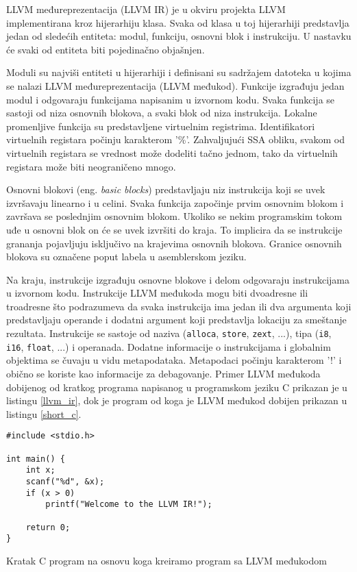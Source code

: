 \documentclass[12pt,oneside]{memoir}
\begin{document}
LLVM međureprezentacija (LLVM IR) je u okviru projekta LLVM implementirana kroz hijerarhiju klasa. Svaka od klasa u toj hijerarhiji predstavlja jedan od sledećih entiteta: modul, funkciju, osnovni blok i instrukciju. U nastavku će svaki od entiteta biti pojedinačno objašnjen.

Moduli su najviši entiteti u hijerarhiji i definisani su sadržajem datoteka u kojima se nalazi LLVM međureprezentacija (LLVM međukod). Funkcije izgrađuju jedan modul i odgovaraju funkcijama napisanim u izvornom kodu. Svaka funkcija se sastoji od niza osnovnih blokova, a svaki blok od niza instrukcija. Lokalne promenljive funkcija su predstavljene virtuelnim registrima. Identifikatori virtuelnih registara počinju karakterom ’\%’. Zahvaljujući SSA obliku, svakom od virtuelnih registara se vrednost može dodeliti tačno jednom, tako da virtuelnih registara može biti neograničeno mnogo.

Osnovni blokovi (eng. \textit{basic blocks}) predstavljaju niz instrukcija koji se uvek izvršavaju linearno i u celini. Svaka funkcija započinje prvim osnovnim blokom i završava se poslednjim osnovnim blokom. Ukoliko se nekim programskim tokom uđe u osnovni blok on će se uvek izvršiti do kraja. To implicira da se instrukcije grananja pojavljuju isključivo na krajevima osnovnih blokova. Granice osnovnih blokova su označene poput labela u asemblerskom jeziku.

Na kraju, instrukcije izgrađuju osnovne blokove i delom odgovaraju instrukcijama u izvornom kodu. Instrukcije LLVM međukoda mogu biti dvoadresne ili troadresne što podrazumeva da svaka instrukcija ima jedan ili dva argumenta koji predstavljaju operande i dodatni argument koji predstavlja lokaciju za smeštanje rezultata. 
Instrukcije se sastoje od naziva (\texttt{alloca}, \texttt{store}, \texttt{zext}, ...), tipa (\texttt{i8}, \texttt{i16}, \texttt{float}, ...) i operanada. Dodatne informacije o instrukcijama i globalnim objektima se čuvaju u vidu metapodataka. Metapodaci počinju karakterom ’!’ i obično se koriste kao informacije za debagovanje. Primer LLVM međukoda dobijenog od kratkog programa napisanog u programskom jeziku C prikazan je u listingu \ref{llvm_ir}, dok je program od koga je LLVM međukod dobijen prikazan u 
listingu \ref{short_c}. 

\begin{listing}
\begin{verbatim}
#include <stdio.h>

int main() {
    int x;
    scanf("%d", &x);
    if (x > 0)
        printf("Welcome to the LLVM IR!");
    
    return 0;
}
\end{verbatim}
\caption{Kratak C program na osnovu koga kreiramo program sa LLVM međukodom}
\label{short_c}
\end{listing}
\end{document}
